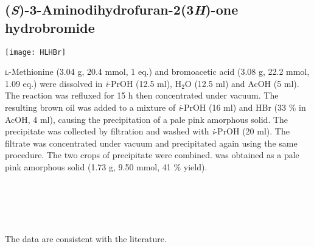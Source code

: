 \subsection{(\textit{S})-3-Aminodihydrofuran-2(3\textit{H})-one hydrobromide }


\begin{scheme}[H]
	\begin{center}
		\texttt{[image: HLHBr]}
	\end{center}
\end{scheme}

\textsc{l}-Methionine  (3.04 g, 20.4 mmol, 1 eq.) and bromoacetic acid  (3.08 g, 22.2 mmol, 1.09 eq.) were dissolved in \textit{i}-PrOH (12.5 ml), H$_2$O (12.5 ml) and AcOH (5 ml). The reaction was refluxed for 15 h then concentrated under vacuum. The resulting brown oil was added to a mixture of \textit{i}-PrOH (16 ml) and HBr (33 \% in AcOH, 4 ml), causing the precipitation of a pale pink amorphous solid. The precipitate was collected by filtration and washed with \textit{i}-PrOH (20 ml). The filtrate was concentrated under vacuum and precipitated again using the same procedure. The two crops of precipitate were combined.  was obtained as a pale pink amorphous solid (1.73 g, 9.50 mmol, 41 \% yield).
\\[1\baselineskip]
\\[1\baselineskip]
\\[1\baselineskip]
\\[1\baselineskip]
\\[1\baselineskip]
\\[1\baselineskip]
The data are consistent with the literature\cite{Stacy2013}.

